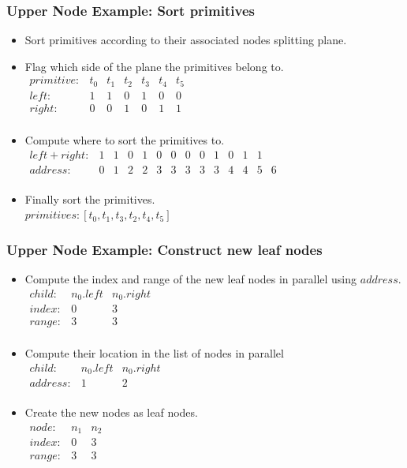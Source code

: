 \documentclass{beamer}
\begin{document}
\begin{frame}
  \frametitle{Upper Node Example: Sort primitives}
  
  \begin{itemize}
  \item Sort primitives according to their associated nodes splitting plane.
  \item Flag which side of the plane the primitives belong to.\\
    $\begin{array}{lcccccc}
    primitive: & t_0 & t_1 & t_2 & t_3 & t_4 & t_5 \\
    left:  & 1 & 1 & 0 & 1 & 0 & 0 \\
    right: & 0 & 0 & 1 & 0 & 1 & 1 \\
    \end{array}$
  \item Compute where to sort the primitives to.\\
    $\begin{array}{lccccccccccccc}
    left+right: & 1 & 1 & 0 & 1 & 0 & 0 & 0 & 0 & 1 & 0 & 1 & 1 \\
    address:    & 0 & 1 & 2 & 2 & 3 & 3 & 3 & 3 & 3 & 4 & 4 & 5 & 6\\
    \end{array}$
  \item Finally sort the primitives.\\
    $primitives: [t_0, t_1, t_3, t_2, t_4, t_5]$
  \end{itemize}
\end{frame}

\begin{frame}
  \frametitle{Upper Node Example: Construct new leaf nodes}
  \begin{itemize}
    \item Compute the index and range of the new leaf nodes in parallel using $address$.\\
      $\begin{array}{lcc}
      child: & n_0.left & n_0.right \\
      index: & 0 & 3 \\
      range: & 3 & 3 \\
      \end{array}$
    \item Compute their location in the list of nodes in parallel\\
      $\begin{array}{lcc}
      child: & n_0.left & n_0.right \\
      address: & 1 & 2 \\
      \end{array}$
    \item Create the new nodes as leaf nodes.\\
      $\begin{array}{lcc}
      node: & n_1 & n_2\\
      index: & 0 & 3\\
      range: & 3 & 3\\
      \end{array}$
  \end{itemize}
\end{frame}
\end{document}
